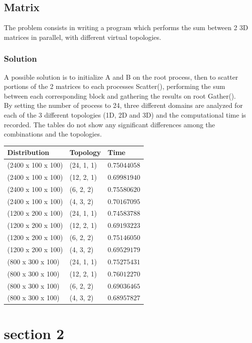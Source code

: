 \documentclass[11pt,a4paper]{report}
\theoremstyle{definition}
\begin{document}
\section{Matrix}
The problem consists in writing a program which performs the sum between 2 3D matrices in parallel, with different virtual topologies.
\subsection{Solution}
A possible solution is to initialize A and B on the root process, then to scatter portions of the 2 matrices to each processes Scatter(), performing the sum between each corresponding block and gathering the results on root Gather().\\
By setting the number of process to 24, three different domains are analyzed for each of the 3 different topologies (1D, 2D and 3D) and the computational time is recorded. The tables do not show any significant differences among the combinations and the topologies.\\
\begin{center}
\begin{tabular}{lll}
\toprule
Distribution & Topology & Time \\
\midrule
(2400 x 100 x 100) & (24, 1, 1) & $0.75044058$ \\
(2400 x 100 x 100) & (12, 2, 1) & $0.69981940$ \\ 
(2400 x 100 x 100) & (6, 2, 2) & $0.75580620$ \\ 
(2400 x 100 x 100) & (4, 3, 2) & $0.70167095$ \\ 
(1200 x 200 x 100) & (24, 1, 1) & $0.74583788$ \\
(1200 x 200 x 100) & (12, 2, 1) & $0.69193223$ \\ 
(1200 x 200 x 100) & (6, 2, 2) & $0.75146050$ \\ 
(1200 x 200 x 100) & (4, 3, 2) & $0.69529179$ \\  
(800 x 300 x 100) & (24, 1, 1) & $0.75275431$ \\
(800 x 300 x 100) & (12, 2, 1) & $0.76012270$ \\  
(800 x 300 x 100) & (6, 2, 2) & $0.69036465$ \\ 
(800 x 300 x 100) & (4, 3, 2) & $0.68957827$ \\ 
\bottomrule
\end{tabular}
\end{center}
\newpage
\chapter{section 2}
\end{document}
